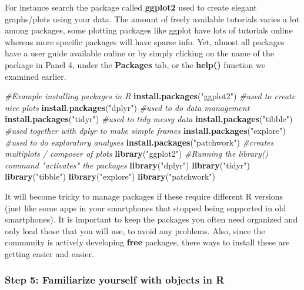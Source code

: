 \documentclass[]{article}
\newenvironment{Shaded}{\begin{snugshade}}{\end{snugshade}}
\newcommand{\CommentTok}[1]{\textcolor[rgb]{0.56,0.35,0.01}{\textit{#1}}}
\newcommand{\KeywordTok}[1]{\textcolor[rgb]{0.13,0.29,0.53}{\textbf{#1}}}
\newcommand{\NormalTok}[1]{#1}
\newcommand{\StringTok}[1]{\textcolor[rgb]{0.31,0.60,0.02}{#1}}
\begin{document}
For instance search the package called \textbf{ggplot2} used to create
elegant graphs/plots using your data. The amount of freely available
tutorials varies a lot among packages, some plotting packages like
ggplot have lots of tutorials online whereas more specific packages will
have sparse info. Yet, almost all packages have a user guide available
online or by simply clicking on the name of the package in Panel 4,
under the \textbf{Packages} tab, or the \textbf{help()} function we
examined earlier.

\begin{Shaded}
\begin{Highlighting}[]
\CommentTok{#Example installing packages in R}
\KeywordTok{install.packages}\NormalTok{(}\StringTok{"ggplot2"}\NormalTok{) }\CommentTok{#used to create nice plots}
\KeywordTok{install.packages}\NormalTok{(}\StringTok{"dplyr"}\NormalTok{) }\CommentTok{#used to do data management}
\KeywordTok{install.packages}\NormalTok{(}\StringTok{"tidyr"}\NormalTok{) }\CommentTok{#used to tidy messy data}
\KeywordTok{install.packages}\NormalTok{(}\StringTok{"tibble"}\NormalTok{) }\CommentTok{#used together with dplyr to make simple frames}
\KeywordTok{install.packages}\NormalTok{(}\StringTok{"explore"}\NormalTok{) }\CommentTok{#used to do exploratory analyses}
\KeywordTok{install.packages}\NormalTok{(}\StringTok{"patchwork"}\NormalTok{) }\CommentTok{#creates multiplots / composer of plots}
\KeywordTok{library}\NormalTok{(}\StringTok{"ggplot2"}\NormalTok{) }\CommentTok{#Running the library() command "activates" the packages}
\KeywordTok{library}\NormalTok{(}\StringTok{"dplyr"}\NormalTok{)}
\KeywordTok{library}\NormalTok{(}\StringTok{"tidyr"}\NormalTok{)}
\KeywordTok{library}\NormalTok{(}\StringTok{"tibble"}\NormalTok{)}
\KeywordTok{library}\NormalTok{(}\StringTok{"explore"}\NormalTok{)}
\KeywordTok{library}\NormalTok{(}\StringTok{"patchwork"}\NormalTok{)}
\end{Highlighting}
\end{Shaded}

It will become tricky to manage packages if these require different R
versions (just like some apps in your smartphones that stopped being
supported in old smartphones). It is important to keep the packages you
often need organized and only load those that you will use, to avoid any
problems. Also, since the community is actively developing \textbf{free}
packages, there ways to install these are getting easier and easier.

\hypertarget{step-5-familiarize-yourself-with-objects-in-r}{%
\subsubsection{Step 5: Familiarize yourself with objects in
R}\label{step-5-familiarize-yourself-with-objects-in-r}}
\end{document}
